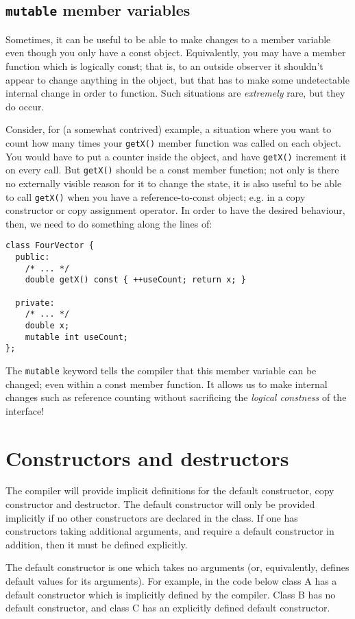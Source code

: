 \documentclass[a4paper]{scrartcl}
\begin{document}
\subsection{\texttt{mutable} member variables}
Sometimes, it can be useful to be able to make changes to a member variable even though you only have a const object. Equivalently, you may have a member function which is logically const; that is, to an outside observer it shouldn't appear to change anything in the object, but that has to make some undetectable internal change in order to function. Such situations are \emph{extremely} rare, but they do occur.

Consider, for (a somewhat contrived) example, a situation where you want to count how many times your \verb|getX()| member function was called on each object. You would have to put a counter inside the object, and have \verb|getX()| increment it on every call. But \verb|getX()| should be a const member function; not only is there no externally visible reason for it to change the state, it is also useful to be able to call \verb|getX()| when you have a reference-to-const object; e.g. in a copy constructor or copy assignment operator. In order to have the desired behaviour, then, we need to do something along the lines of:

\begin{verbatim}
class FourVector {
  public:
    /* ... */
    double getX() const { ++useCount; return x; }
  
  private:
    /* ... */
    double x;
    mutable int useCount;
};
\end{verbatim}

The \verb|mutable| keyword tells the compiler that this member variable can be changed; even within a const member function. It allows us to make internal changes such as reference counting without sacrificing the \emph{logical constness} of the interface!

\section{Constructors and destructors}
The compiler will provide implicit definitions for the default constructor, copy constructor and destructor. The default constructor will only be provided implicitly if no other constructors are declared in the class. If one has constructors taking additional arguments, and require a default constructor in addition, then it must be defined explicitly.

The default constructor is one which takes no arguments (or, equivalently, defines default values for its arguments). For example, in the code below class A has a default constructor which is implicitly defined by the compiler. Class B has no default constructor, and class C has an explicitly defined default constructor.
\end{document}
